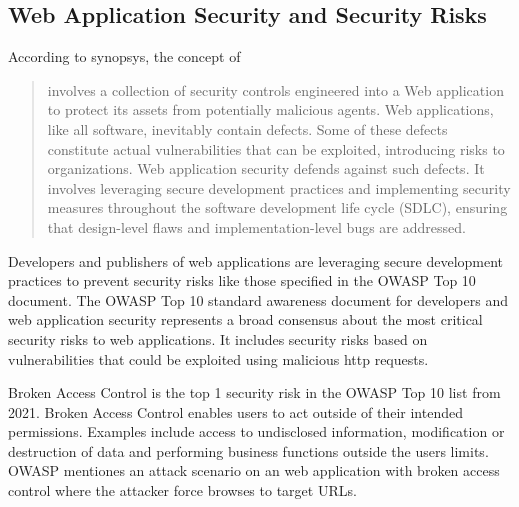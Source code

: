 \subsection{Web Application Security and Security Risks}
According to synopsys, the concept of 
\begin{quote}
	involves a collection of security controls engineered into a Web application to protect its assets from potentially malicious agents. Web applications, like all software, inevitably contain defects. Some of these defects constitute actual vulnerabilities that can be exploited, introducing risks to organizations. Web application security defends against such defects. It involves leveraging secure development practices and implementing security measures throughout the software development life cycle (SDLC), ensuring that design-level flaws and implementation-level bugs are addressed.
\end{quote}
Developers and publishers of web applications are leveraging secure development practices to prevent security risks like those specified in the OWASP Top 10 document.
The OWASP Top 10 standard awareness document for developers and web application security represents a broad consensus about the most critical security risks to web applications.
It includes security risks based on vulnerabilities that could be exploited using malicious \acrshort{http} requests.
\cite{OWASP/Top10}

Broken Access Control is the top 1 security risk in the OWASP Top 10 list from 2021.
Broken Access Control enables users to act outside of their intended permissions.
Examples include access to undisclosed information, modification or destruction of data and performing business functions outside the users limits.
OWASP mentiones an attack scenario on an web application with broken access control where the attacker force browses to target URLs. \cite{OWASP/BrokenAccessControl,OWASP/Risks2021}

